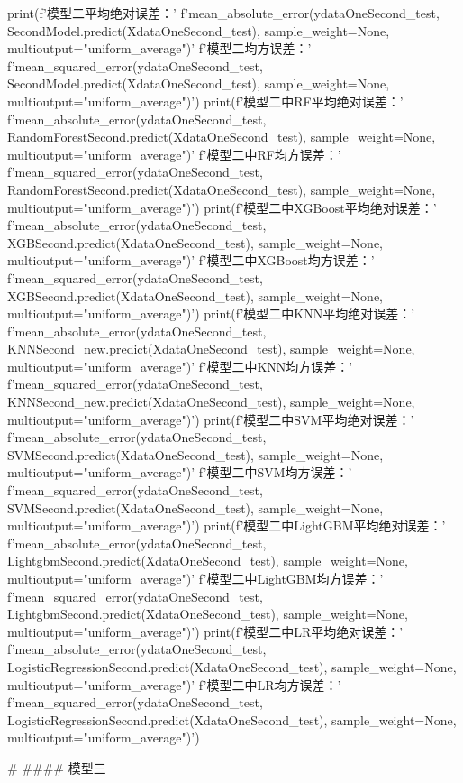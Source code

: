 \documentclass{MathorCupmodeling}
\begin{document}
\begin{python}
	
	print(f'模型二平均绝对误差：'
		  f'{mean_absolute_error(ydataOneSecond_test, SecondModel.predict(XdataOneSecond_test), sample_weight=None, multioutput="uniform_average")}\n'
		  f'模型二均方误差：'
		  f'{mean_squared_error(ydataOneSecond_test, SecondModel.predict(XdataOneSecond_test), sample_weight=None, multioutput="uniform_average")}')
	print(f'模型二中RF平均绝对误差：'
		  f'{mean_absolute_error(ydataOneSecond_test, RandomForestSecond.predict(XdataOneSecond_test), sample_weight=None, multioutput="uniform_average")}\n'
		  f'模型二中RF均方误差：'
		  f'{mean_squared_error(ydataOneSecond_test, RandomForestSecond.predict(XdataOneSecond_test), sample_weight=None, multioutput="uniform_average")}')
	print(f'模型二中XGBoost平均绝对误差：'
		  f'{mean_absolute_error(ydataOneSecond_test, XGBSecond.predict(XdataOneSecond_test), sample_weight=None, multioutput="uniform_average")}\n'
		  f'模型二中XGBoost均方误差：'
		  f'{mean_squared_error(ydataOneSecond_test, XGBSecond.predict(XdataOneSecond_test), sample_weight=None, multioutput="uniform_average")}')
	print(f'模型二中KNN平均绝对误差：'
		  f'{mean_absolute_error(ydataOneSecond_test, KNNSecond_new.predict(XdataOneSecond_test), sample_weight=None, multioutput="uniform_average")}\n'
		  f'模型二中KNN均方误差：'
		  f'{mean_squared_error(ydataOneSecond_test, KNNSecond_new.predict(XdataOneSecond_test), sample_weight=None, multioutput="uniform_average")}')
	print(f'模型二中SVM平均绝对误差：'
		  f'{mean_absolute_error(ydataOneSecond_test, SVMSecond.predict(XdataOneSecond_test), sample_weight=None, multioutput="uniform_average")}\n'
		  f'模型二中SVM均方误差：'
		  f'{mean_squared_error(ydataOneSecond_test, SVMSecond.predict(XdataOneSecond_test), sample_weight=None, multioutput="uniform_average")}')
	print(f'模型二中LightGBM平均绝对误差：'
		  f'{mean_absolute_error(ydataOneSecond_test, LightgbmSecond.predict(XdataOneSecond_test), sample_weight=None, multioutput="uniform_average")}\n'
		  f'模型二中LightGBM均方误差：'
		  f'{mean_squared_error(ydataOneSecond_test, LightgbmSecond.predict(XdataOneSecond_test), sample_weight=None, multioutput="uniform_average")}')
	print(f'模型二中LR平均绝对误差：'
		  f'{mean_absolute_error(ydataOneSecond_test, LogisticRegressionSecond.predict(XdataOneSecond_test), sample_weight=None, multioutput="uniform_average")}\n'
		  f'模型二中LR均方误差：'
		  f'{mean_squared_error(ydataOneSecond_test, LogisticRegressionSecond.predict(XdataOneSecond_test), sample_weight=None, multioutput="uniform_average")}')
	
	# #### 模型三
	

\end{python}
\end{document}
